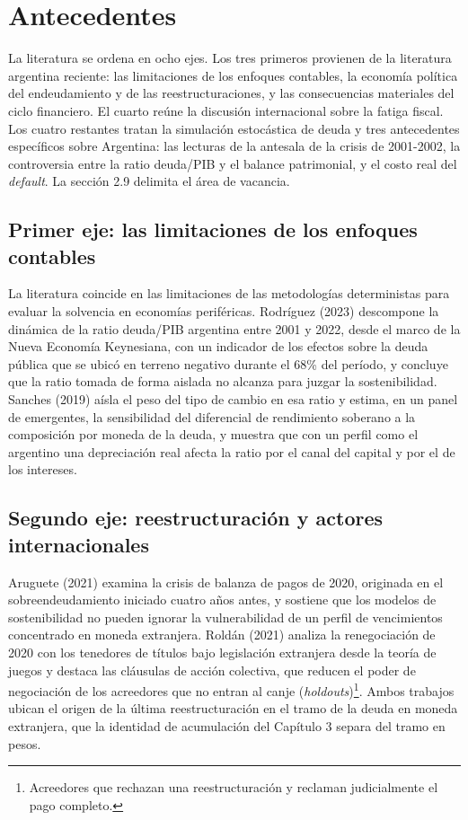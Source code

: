 \chapter{Antecedentes}

La literatura se ordena en ocho ejes. Los tres primeros provienen de la
literatura argentina reciente: las limitaciones de los enfoques
contables, la economía política del endeudamiento y de las
reestructuraciones, y las consecuencias materiales del ciclo financiero.
El cuarto reúne la discusión internacional sobre la fatiga fiscal. Los
cuatro restantes tratan la simulación estocástica de deuda y tres
antecedentes específicos sobre Argentina: las lecturas de la antesala de
la crisis de 2001-2002, la controversia entre la ratio deuda/PIB y el
balance patrimonial, y el costo real del \emph{default}. La sección 2.9
delimita el área de vacancia.

\section{Primer eje: las limitaciones de los enfoques contables}

La literatura coincide en las limitaciones de las metodologías
deterministas para evaluar la solvencia en economías periféricas.
Rodríguez (2023) descompone la dinámica de la ratio deuda/PIB argentina
entre 2001 y 2022, desde el marco de la Nueva Economía Keynesiana, con
un indicador de los efectos sobre la deuda pública que se ubicó en
terreno negativo durante el 68\% del período, y concluye que la ratio
tomada de forma aislada no alcanza para juzgar la sostenibilidad.
Sanches (2019) aísla el peso del tipo de cambio en esa ratio y estima,
en un panel de emergentes, la sensibilidad del diferencial de
rendimiento soberano a la composición por moneda de la deuda, y muestra
que con un perfil como el argentino una depreciación real afecta la
ratio por el canal del capital y por el de los intereses.

\section{Segundo eje: reestructuración y actores internacionales}

Aruguete (2021) examina la crisis de balanza de pagos de 2020, originada
en el sobreendeudamiento iniciado cuatro años antes, y sostiene que los
modelos de sostenibilidad no pueden ignorar la vulnerabilidad de un
perfil de vencimientos concentrado en moneda extranjera. Roldán (2021)
analiza la renegociación de 2020 con los tenedores de títulos bajo
legislación extranjera desde la teoría de juegos y destaca las cláusulas
de acción colectiva, que reducen el poder de negociación de los
acreedores que no entran al canje (\emph{holdouts})\footnote{Acreedores
  que rechazan una reestructuración y reclaman judicialmente el pago
  completo.}. Ambos trabajos ubican el origen de la última
reestructuración en el tramo de la deuda en moneda extranjera, que la
identidad de acumulación del Capítulo 3 separa del tramo en pesos.

